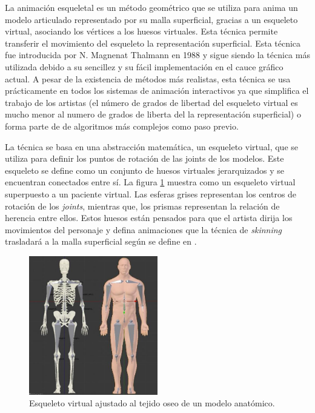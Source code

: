 La animación esqueletal es un método geométrico que se utiliza para anima un modelo articulado representado por su malla superficial, gracias a un esqueleto virtual, asociando los vértices a los huesos virtuales. Esta técnica permite transferir el movimiento del esqueleto la representación superficial. Esta técnica fue introducida por N. Magnenat Thalmann en 1988 \cite{thalmann88} y sigue siendo la técnica más utilizada debido a su sencillez y su fácil implementación en el cauce gráfico actual. A pesar de la existencia de métodos más realistas, esta técnica se usa prácticamente en todos los sistemas de animación interactivos ya que simplifica el trabajo de los artistas (el número de grados de libertad del esqueleto virtual es mucho menor al numero de grados de liberta del la representación superficial) o forma parte de de algoritmos más complejos como paso previo. %

La técnica se basa en una abstracción matemática, un esqueleto virtual, que se utiliza para definir los puntos de rotación de las \acl{joints} de los modelos. Este esqueleto se define como un conjunto de huesos virtuales jerarquizados y se encuentran conectados entre sí. La figura \ref{fig:virtualskeleton} muestra como un esqueleto virtual superpuesto a un paciente virtual. Las esferas grises representan los centros de rotación de los \emph{\acs{joints}}, mientras que, los prismas representan la relación de herencia entre ellos. Estos huesos están pensados para que el artista dirija los movimientos del personaje y defina animaciones que la técnica de \emph{skinning} trasladará a la malla superficial según se define en \cite{thalmann88}. 

\begin{figure}[h]
   \centering
    \includegraphics[width=0.5\textwidth]{IMG/virtualskeleton.png}
    \caption{Esqueleto virtual ajustado al tejido oseo de un modelo anatómico.}
   \label{fig:virtualskeleton}
\end{figure}


